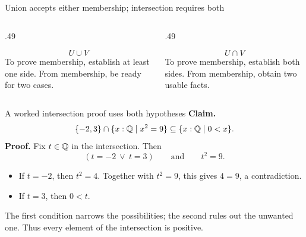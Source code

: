 \begin{frame}{Union accepts either membership; intersection requires both}
\begin{columns}[T]
\begin{column}{.49\textwidth}
\centering
{}
\[
 U\cup V
\]
To prove membership, establish at least one side.
From membership, be ready for two cases.
\end{column}
\begin{column}{.49\textwidth}
\centering
{}
\[
 U\cap V
\]
To prove membership, establish both sides.
From membership, obtain two usable facts.
\end{column}
\end{columns}
\end{frame}

\begin{frame}{A worked intersection proof uses both hypotheses}
\textbf{Claim.}
\[
 \{-2,3\}\cap\{x:\mathbb{Q}\mid x^2=9\}\subseteq\{x:\mathbb{Q}\mid0<x\}.
\]
\textbf{Proof.} Fix $t\in\mathbb{Q}$ in the intersection. Then
\[
 (t=-2\ \lor\ t=3)\qquad\text{and}\qquad t^2=9.
\]
\begin{itemize}
\item If $t=-2$, then $t^2=4$. Together with $t^2=9$, this gives $4=9$, a contradiction.
\item If $t=3$, then $0<t$.
\end{itemize}
The first condition narrows the possibilities; the second rules out the unwanted one.
Thus every element of the intersection is positive.
\end{frame}

